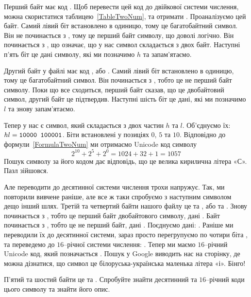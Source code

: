 Перший байт має код .
Щоб перевести цей код до двійкової системи числення, можна скористатися таблицею~\ref{TableTwoNum}, та отримати .
Проаналізуємо цей байт.
Самий лівий біт встановлено в одиницю, тому це багатобайтний символ.
Він не починається з , тому це перший байт символу, що доволі логічно.
Він починається з , що означає, що у нас символ складається з двох байт.
Наступні п'ять біт  це дані символу, які ми позначимо $h$ та запам'ятаємо.

Другий байт у файлі має код , або .
Самий лівий біт встановлено в одиницю, тому це багатобайтний символ.
Він починається з , тобто це не перший байт символу.
Поки що все сходиться, перший байт сказав, що це двобайтовий символ, другий байт це підтвердив.
Наступні шість біт  це дані, які ми позначимо $l$ та знову запам'ятаємо.

Тепер у нас є символ, який складається з двох частин $h$ та $l$.
Об'єднуємо їх: $hl = \hbox{{\tt 10000 100001}}$.
Біти встановлені у позиціях $0$, $5$ та $10$.
Відповідно до формули~\ref{FormulaTwoNum} ми отримаємо Unicode код символу
\begin{equation}
2^{10} + 2^5 + 2^0 = 1024 + 32 + 1 = 1057
\end{equation}
Пошук символу за його кодом дає відповідь, що це велика кирилична літера «С».
Пазл зійшовся.

Але переводити до десятинної системи числення трохи напружує.
Так, ми повторили вивчене раніше, але все ж таки спробуємо з наступним символом дещо інший шлях.
Третій та четвертий байти нашого файлу це  та , або  та .
Знову  починається з , тобто це перший байт двобайтового символу, дані .
Байт  починається з , тобто це не перший байт, дані .
Поєднуємо дані: .
Раніше ми переводили їх до десятинної системи, зараз просто перегрупуємо по чотири біта , та переведемо до $16$--річної системи числення: .
Тепер ми маємо $16$--річний Unicode код, який позначається .
Пошук у Google виводить нас на сторінку, де можна дізнатися, що символ  це білоруська-українська маленька літера «і».
Бінго!

\begin{exercise}
П'ятий та шостий байти це  та .
Спробуйте знайти десятинний та $16$--річний коди цього символу та знайти його опис.
\end{exercise}


